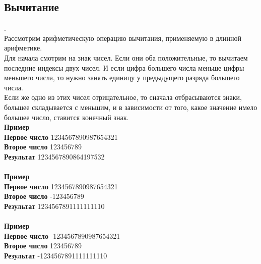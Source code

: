\documentclass[a4paper]{article}
\begin{document}
\subsection{Вычитание}.
\\Рассмотрим арифметическую операцию вычитания, применяемую в длинной арифметике.
\\Для начала смотрим на знак чисел. Если они оба положительные, то вычитаем последние индексы двух чисел. И если цифра большего числа меньше цифры меньшего числа, то нужно занять единицу у предыдущего разряда большего числа.
\\Если же одно из этих чисел отрицательное, то сначала отбрасываются знаки, большее складывается с меньшим, и в зависимости от того, какое значение имело большее число, ставится конечный знак.
\\ \textbf{Пример}
\\ \textbf{Первое число} 1234567890987654321
\\ \textbf{Второе число} 123456789
\\ \textbf{Результат} 1234567890864197532
\\
\\ \textbf{Пример}
\\ \textbf{Первое число} 1234567890987654321
\\ \textbf{Второе число} -123456789
\\ \textbf{Результат} 1234567891111111110
\\
\\ \textbf{Пример}
\\ \textbf{Первое число} -1234567890987654321
\\ \textbf{Второе число} 123456789
\\ \textbf{Результат} -1234567891111111110
\end{document}
